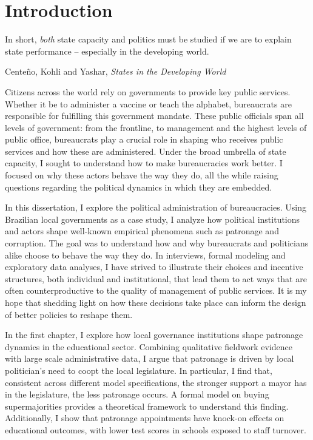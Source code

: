 \section*{Introduction}

\epigraph{\singlespacing In short, \emph{both} state capacity and politics must be studied if we are to explain state performance -- especially in the developing world.}{\singlespacing Cente\~{n}o, Kohli and Yashar, \emph{States in the Developing World}}

\doublespacing

Citizens across the world rely on governments to provide key public services. Whether it be to administer a vaccine or teach the alphabet, bureaucrats are responsible for fulfilling this government mandate. These public officials span all levels of government: from the frontline, to management and the highest levels of public office, bureaucrats play a crucial role in shaping who receives public services and how these are administered. Under the broad umbrella of state capacity, I sought to understand how to make bureaucracies work better. I focused on why these actors behave the way they do, all the while raising questions regarding the political dynamics in which they are embedded.

In this dissertation, I explore the political administration of bureaucracies. Using Brazilian local governments as a case study, I analyze how political institutions and actors shape well-known empirical phenomena such as patronage and corruption. The goal was to understand how and why bureaucrats and politicians alike choose to behave the way they do. In interviews, formal modeling and exploratory data analyses, I have strived to illustrate their choices and incentive structures, both individual and institutional, that lead them to act ways that are often counterproductive to the quality of management of public services. It is my hope that shedding light on how these decisions take place can inform the design of better policies to reshape them.

In the first chapter, I explore how local governance institutions shape patronage dynamics in the educational sector. Combining qualitative fieldwork evidence with large scale administrative data, I argue that patronage is driven by local politician's need to coopt the local legislature. In particular, I find that, consistent across different model specifications, the stronger support a mayor has in the legislature, the less patronage occurs. A formal model on buying supermajorities provides a theoretical framework to understand this finding. Additionally, I show that patronage appointments have knock-on effects on educational outcomes, with lower test scores in schools exposed to staff turnover.

